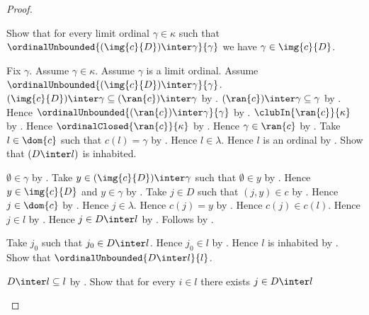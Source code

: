 \begin{proof}
    \begin{subproof}
        Show that for every limit ordinal $\gamma\in\kappa$ such that
            $\ordinalUnbounded{(\img{c}{D})\inter\gamma}{\gamma}$
            we have $\gamma\in\img{c}{D}$.
        \begin{subproof}
            Fix $\gamma$.
            Assume $\gamma\in\kappa$.
            Assume $\gamma$ is a limit ordinal.
            Assume $\ordinalUnbounded{(\img{c}{D})\inter\gamma}{\gamma}$.
            $(\img{c}{D})\inter\gamma
                \subseteq(\ran{c})\inter\gamma$
                by .
            $(\ran{c})\inter\gamma\subseteq\gamma$
                by .
            Hence $\ordinalUnbounded{(\ran{c})\inter\gamma}{\gamma}$
                by .
            $\clubIn{\ran{c}}{\kappa}$
                by .
            Hence $\ordinalClosed{\ran{c}}{\kappa}$
                by .
            Hence $\gamma\in\ran{c}$ by .
            Take $l\in\dom{c}$ such that $c(l)=\gamma$
                by .
            Hence $l\in\lambda$.
            Hence $l$ is an ordinal by .
            Show that $(D\inter l)$ is inhabited.
            \begin{subproof}
                $\emptyset\in\gamma$ by .
                Take $y\in(\img{c}{D})\inter\gamma$ such that
                    $\emptyset\in y$ by .
                Hence $y\in\img{c}{D}$ and $y\in\gamma$
                    by .
                Take $j\in D$ such that $(j,y)\in c$
                    by .
                Hence $j\in\dom{c}$ by .
                Hence $j\in\lambda$.
                Hence $c(j)=y$ by .
                Hence $c(j)\in c(l)$.
                Hence $j\in l$
                    by .
                Hence $j\in D\inter l$ by .
                Follows by \auto.
            \end{subproof}
            Take $j_0$ such that $j_0\in D\inter l$.
            Hence $j_0\in l$ by .
            Hence $l$ is inhabited by \auto.
            Show that $\ordinalUnbounded{D\inter l}{l}$.
            \begin{subproof}
                $D\inter l\subseteq l$ by .
                Show that for every $i\in l$ there exists $j\in D\inter l$

\end{subproof}
\end{subproof}
\end{subproof}
\end{proof}
